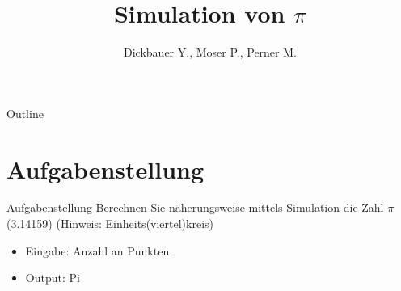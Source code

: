 

\title[BSP13 - Simulation von $\pi$]{Simulation von $\pi$}
\author{Dickbauer Y., Moser P., Perner M.}



\begin{frame}
  \titlepage
\end{frame}

\begin{frame}{Outline}
  \tableofcontents
\end{frame}

\section{Aufgabenstellung}
\begin{frame}{Aufgabenstellung}
Berechnen Sie näherungsweise mittels Simulation die Zahl $\pi$ (3.14159) (Hinweis: Einheits(viertel)kreis)
\begin{itemize}
  \item Eingabe: Anzahl an Punkten
  \item Output: Pi
\end{itemize}

\end{frame}

